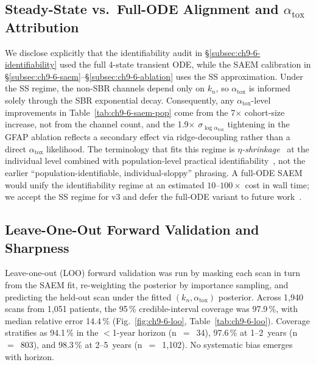 \subsection{Steady-State vs.\ Full-ODE Alignment and $\alpha_\text{tox}$ Attribution}
\label{subsec:ch9-6-ss-vs-ode}

We disclose explicitly that the identifiability audit in \S\ref{subsec:ch9-6-identifiability} used the full 4-state transient ODE, while the SAEM calibration in \S\ref{subsec:ch9-6-saem}--\S\ref{subsec:ch9-6-ablation} uses the SS approximation. Under the SS regime, the non-SBR channels depend only on $k_n$, so $\alpha_\text{tox}$ is informed solely through the SBR exponential decay. Consequently, any $\alpha_\text{tox}$-level improvements in Table~\ref{tab:ch9-6-saem-pop} come from the 7$\times$ cohort-size increase, not from the channel count, and the 1.9$\times$ $\sigma_{\log \alpha_\text{tox}}$ tightening in the GFAP ablation reflects a secondary effect via ridge-decoupling rather than a direct $\alpha_\text{tox}$ likelihood. The terminology that fits this regime is \emph{$\eta$-shrinkage}~\cite{savickarlsson2009aaps} at the individual level combined with population-level practical identifiability~\cite{raue2009,villaverde2016}, not the earlier ``population-identifiable, individual-sloppy'' phrasing. A full-ODE SAEM would unify the identifiability regime at an estimated $10$--$100\times$ cost in wall time; we accept the SS regime for v3 and defer the full-ODE variant to future work~\cite{veronneau2020}.

\subsection{Leave-One-Out Forward Validation and Sharpness}
\label{subsec:ch9-6-loo}

Leave-one-out (LOO) forward validation was run by masking each scan in turn from the SAEM fit, re-weighting the posterior by importance sampling, and predicting the held-out scan under the fitted $(k_n, \alpha_\text{tox})$ posterior. Across 1,940 scans from 1,051 patients, the 95\,\% credible-interval coverage was 97.9\,\%, with median relative error 14.4\,\% (Fig.~\ref{fig:ch9-6-loo}, Table~\ref{tab:ch9-6-loo}). Coverage stratifies as 94.1\,\% in the $<$1-year horizon (n~$=$~34), 97.6\,\% at 1--2~years (n~$=$~803), and 98.3\,\% at 2--5~years (n~$=$~1,102). No systematic bias emerges with horizon.

